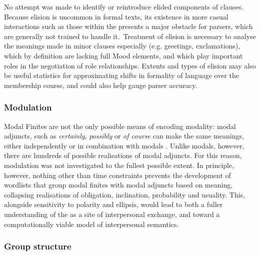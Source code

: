 No attempt was made to identify or reintroduce elided components of clauses. Because elision is uncommon in formal texts, its existence in more casual interactions such as those within the  presents a major obstacle for parsers, which are generally not trained to handle it.~Treatment of elision is necessary to analyse the meanings made in minor clauses especially (e.g. greetings, exclamations), which by definition are lacking full Mood elements, and which play important roles in the negotiation of role relationships. Extents and types of elision may also be useful statistics for approximating shifts in formality of language over the membership course, and could also help gauge parser accuracy.

\subsubsection*{Modulation}

Modal Finites are not the only possible means of encoding modality: modal adjuncts, such as \emph{certainly}, \emph{possibly} or \emph{of course} can make the same meanings, either independently or in combination with modals \cite{eggins_introduction_2004}. Unlike modals, however, there are hundreds of possible realisations of modal adjuncts. For this reason, modulation was not investigated to the fullest possible extent. In principle, however, nothing other than time constraints prevents the development of wordlists that group modal finites with modal adjuncts based on meaning, collapsing realisations of obligation, inclination, probability and usuality. This, alongside sensitivity to polarity and ellipsis, would lead to both a fuller understanding of the  as a site of interpersonal exchange, and toward a computationally viable model of interpersonal semantics.

\subsubsection*{Group structure}

